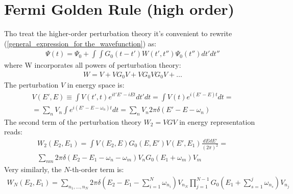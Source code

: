 \section{Fermi Golden Rule (high order)}
Tho treat the higher-order perturbation theory it's convenient to rewrite (\ref{general_expression_for the_wavefunction}) as:
\begin{gather}
	\Psi(t)=\Psi_{0}+\int\int G_{0}(t-t')W(t',t'')\Psi_{0}(t'')dt'dt''
\end{gather}
where W incorporates all powers of perturbation theory:
\begin{gather}
	W=V+VG_0V+VG_0VG_0V+\dots
\end{gather}
The perturbation $ V $ in energy space is:
\begin{multline}
	V(E',E)\equiv\int V(t',t)e^{it'E'-iEt}dt'dt=\int V(t)e^{i(E'-E)t}dt=\\=\sum_{n}V_{n}\int e^{i(E'-E-\omega_{n})t}dt=\sum_{n}V_{n}2\pi\delta(E'-E-\omega_{n})
\end{multline}
The second term of the perturbation theory $ W_{2}=VGV $ in energy representation reads:
\begin{multline}
	W_{2}(E_{2},E_{1})=
	\int V(E_{2},E)G_0(E,E')V(E',E_{1})\frac{dEdE'}{(2\pi)^{2}}=
	\\
	\sum_{nm}2\pi\delta(E_{2}-E_{1}-\omega_{n}-\omega_{m})V_{n}G_{0}(E_{1}+\omega_{m})V_{m}
\end{multline} 
Very similarly, the $ N $-th-order term is:
\begin{gather}
	W_{N}(E_{2},E_{1})=\sum_{n_{1},\dots,n_{N}}2\pi\delta\left(E_{2}-E_{1}-\sum_{i=1}^{N}\omega_{n_{i}}\right)V_{n_{N}}\prod_{j=1}^{N-1}G_{0}\left(E_{1}+\sum_{s=1}^{j}\omega_{n_{s}}\right)V_{n_{j}}
\end{gather}

